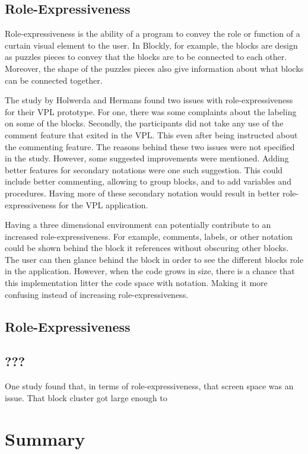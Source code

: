 \documentclass{sigchi}
\begin{document}
\subsection{Role-Expressiveness}
Role-expressiveness is the ability of a program to convey the role or function of a curtain visual element to the user. In Blockly, for example, the blocks are design as puzzles pieces to convey that the blocks are to be connected to each other. Moreover, the shape of the puzzles pieces also give information about what blocks can be connected together.

The study by Holwerda and Hermans found two issues with role-expressiveness for their VPL prototype. For one, there was some complaints about the labeling on some of the blocks. Secondly, the participants did not take any use of the comment feature that exited in the VPL. This even after being instructed about the commenting feature. The reasons behind these two issues were not specified in the study. However, some suggested improvements were mentioned. Adding better features for secondary notations were one such suggestion. This could include better commenting, allowing to group blocks, and to add variables and procedures. Having more of these secondary notation would result in better role-expressiveness for the VPL application.

Having a three dimensional environment can potentially contribute to an increased role-expressiveness. For example, comments, labels, or other notation could be shown behind the block it references without obscuring other blocks. The user can then glance behind the block in order to see the different blocks role in the application. However, when the code grows in size, there is a chance that this implementation litter the code space with notation. Making it more confusing instead of increasing role-expressiveness.

\subsection{Role-Expressiveness}

\subsection{???}
One study found that, in terms of role-expressiveness, that screen space was an issue. That block cluster got large enough to

\section{Summary}
\end{document}

